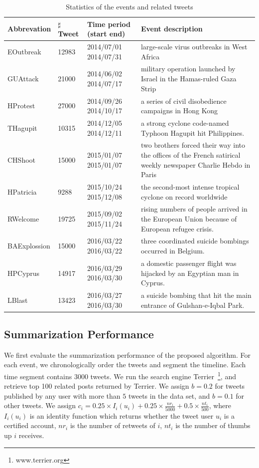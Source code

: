\documentclass[envcountsame]{llncs}
\begin{document}
\vspace{-0.6cm}
\begin{table}[ht]
\caption{Statistics of the events and related tweets}\label{table:static}
\begin{center}
\tiny
\begin{tabular}{|p{1.5cm}|p{0.9cm}|p{1.3cm}|p{6cm}|}
    \hline
    Abbrevation & $\sharp$ Tweet & Time period (start end) &  Event description\\
    \hline
    EOutbreak & 12983 & 2014/07/01  2014/07/31 &  large-scale virus outbreaks in West Africa \\
    \hline
    GUAttack & 21000 & 2014/06/02  2014/07/17 &military operation launched by Israel in the Hamas-ruled Gaza Strip \\
    \hline
    HProtest & 27000 & 2014/09/26  2014/10/17 & a series of civil disobedience campaigns  in Hong Kong \\
    \hline
    THagupit & 10315 & 2014/12/05  2014/12/11 & a strong cyclone code-named Typhoon Hagupit hit Philippines. \\
    \hline
    CHShoot & 15000 & 2015/01/07  2015/01/07 &two brothers forced their way into the offices of the French satirical weekly newspaper Charlie Hebdo in Paris \\
    \hline
    HPatricia & 9288 & 2015/10/24  2015/12/08 &  the second-most intense tropical cyclone on record worldwide \\
    \hline
    RWelcome & 19725 & 2015/09/02  2015/11/24 & rising numbers of people arrived in the European Union because of European refugee crisis.\\
    \hline
    BAExplossion & 15000 & 2016/03/22  2016/03/22 &three coordinated suicide bombings occurred in Belgium.\\
    \hline
    HPCyprus & 14917 & 2016/03/29 2016/03/30 & a domestic passenger flight was hijacked by an Egyptian man in Cyprus.\\
    \hline
    LBlast & 13423 & 2016/03/27  2016/03/30 & a suicide bombing that hit the main entrance of Gulshan-e-Iqbal Park.\\
    \hline
\end{tabular}
\end{center}
\label{default}
\end{table}

\subsection{Summarization Performance}
We first evaluate the summarization performance of the proposed algorithm. For each event, we chronologically order the tweets and segment the timeline. Each time segment contains 3000 tweets. We run the search engine Terrier~\footnote{www.terrier.org}, and  retrieve top 100 related posts returned by Terrier. We assign $b=0.2$ for tweets published by any user with more than $5$ tweets in the data set, and $b=0.1$ for other tweets. We assign $c_i=0.25\times I_i(u_i) + 0.25\times \frac{nr_i}{5000}+ 0.5 \times \frac{nt_i}{500}$, where $I_i(u_i)$ is an identity function which returns whether the tweet user $u_i$ is a certified account, $nr_i$ is the number of retweets of $i$, $nt_i$ is the number of thumbs up  $i$ receives.
\end{document}
